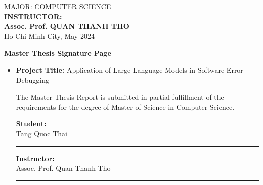 \documentclass[a4paper,oneside]{book}
\begin{document}
\begin{titlepage}
    \begin{center}
        {\fontsize{14.4pt}{1} MAJOR: COMPUTER SCIENCE}\\[.2cm]
        {\fontsize{14.4pt}{1}
        \textbf{INSTRUCTOR:}\\[.2cm]
        \textbf{Assoc. Prof. QUAN THANH THO}\\[.2cm]
        {\fontsize{14.4pt}{1} Ho Chi Minh City, May 2024}}
    \end{center}
\end{titlepage}

\newpage
\begin{titlepage}
    \thispagestyle{empty}
    \begin{center}
        \begin{large}
            \textbf{Master Thesis Signature Page}
        \end{large}
    \end{center}
    \vspace{1.2cm}
    \begin{itemize}
        \item[] \textbf{Project Title:} Application of Large Language Models in Software Error Debugging
            \vspace{1cm}

            The Master Thesis Report is submitted in partial fulfillment of the requirements for the degree of Master of Science in Computer Science.
            \vspace{2cm}

            \begin{minipage}{0.5\textwidth}
                \textbf{Student:} \\[2cm]
                Tang Quoc Thai\\[0.25cm]
                \hrulefill
                \rule{7cm}{0.4pt}
            \end{minipage}
            \begin{minipage}{0.5\textwidth}
                \begin{flushright}
                    \textbf{Instructor:} \\[2cm]
                    Assoc. Prof. Quan Thanh Tho\\[0.25cm]
                    \hrulefill
                    \rule{7cm}{0.4pt}
                \end{flushright}
            \end{minipage}
            \vspace{1cm}
    \end{itemize}
\end{titlepage}
\end{document}
